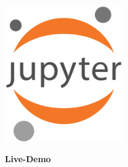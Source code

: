 \documentclass[aspectratio=169,11pt]{beamer}
\newcommand{\thgablue}[1]{\textcolor{thgablue}{#1}}
\begin{document}
\begin{frame}[plain]
    \begin{center}
    \vfill
    
    \href{http://localhost:8888/lab/tree/Users/robin/Nextcloud/90\%20Academia/10\%20Vortra\%CC\%88ge/2025-06-30\%20Best\%20Practice\%20Lehre/05\%20Demo}{%
        \includegraphics[height=6cm]{../img/jupyter_logo}
    }
    
    \vspace{1cm}
    
    {\Huge\textbf{\thgablue{Live-Demo}}}
    
    \end{center}
\end{frame}
\end{document}
